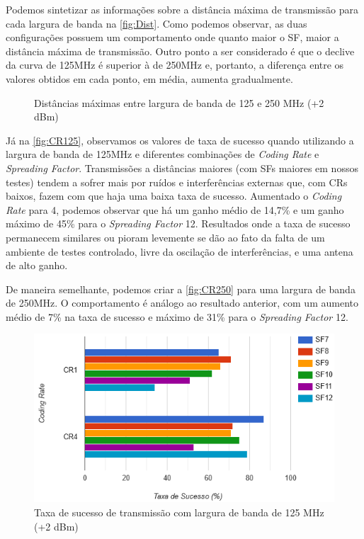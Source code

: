 \documentclass[
	12pt,				%
	openright,			%
	twoside,			%
	a4paper,			%
	english,			%
	french,				%
	spanish,			%
	brazil				%
	]{abntex2}
\begin{document}
Podemos sintetizar as informações sobre a distância máxima de transmissão para cada largura de banda na \autoref{fig:Dist}. Como podemos observar, as duas configurações possuem um comportamento onde quanto maior o SF, maior a distância máxima de transmissão. Outro ponto a ser considerado é que o declive da curva de 125MHz é superior à de 250MHz e, portanto, a diferença entre os valores obtidos em cada ponto, em média, aumenta gradualmente.

\newpage

\begin{figure}[H]
	\caption{\label{fig:Dist}Distâncias máximas entre largura de banda de 125 e 250 MHz (+2 dBm)}
	\begin{center}
	    
	\end{center}
\end{figure}

Já na \autoref{fig:CR125}, observamos os valores de taxa de sucesso quando utilizando a largura de banda de 125MHz e diferentes combinações de \emph{Coding Rate} e \emph{Spreading Factor}. Transmissões a distâncias maiores (com SFs maiores em nossos testes) tendem a sofrer mais por ruídos e interferências externas que, com CRs baixos, fazem com que haja uma baixa taxa de sucesso. Aumentado o \emph{Coding Rate} para 4, podemos observar que há um ganho médio de 14,7\% e um ganho máximo de 45\% para o \emph{Spreading Factor} 12. Resultados onde a taxa de sucesso permanecem similares ou pioram levemente se dão ao fato da falta de um ambiente de testes controlado, livre da oscilação de interferências, e uma antena de alto ganho.

De maneira semelhante, podemos criar a \autoref{fig:CR250} para uma largura de banda de 250MHz. O comportamento é análogo ao resultado anterior, com um aumento médio de 7\% na taxa de sucesso e máximo de 31\% para o \emph{Spreading Factor} 12.

\newpage

\begin{figure}[H]
	\caption{\label{fig:CR125}Taxa de sucesso de transmissão com largura de banda de 125 MHz (+2 dBm)}
	\begin{center}
	    \includegraphics[scale=0.9]{img/CR125.png}
	\end{center}
\end{figure}
\end{document}
